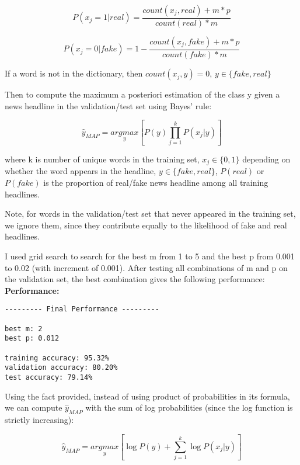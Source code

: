 \documentclass{article}
\begin{document}
$$P(x_j = 1 | real) = \frac{count(x_j, real) + m*p}{count(real) * m}$$

$$P(x_j = 0 | fake) = 1 - \frac{count(x_j, fake)+m*p}{count(fake) * m} $$

If a word is not in the dictionary, then $count(x_j, y) = 0$, $y\in \{fake, real\}$

Then to compute the maximum a posteriori estimation of the class y given a news headline in the validation/test set using Bayes' rule:

$$\hat{y}_{MAP} = \underset{y}{argmax} [P(y)\prod_{j = 1}^k P(x_j | y)]$$

where k is number of unique words in the training set, $x_j \in \{0, 1\}$ depending on whether the word appears in the headline, $y \in \{fake, real\}$, $P(real)$ or $P(fake)$ is the proportion of real/fake news headline among all training headlines.

Note, for words in the validation/test set that never appeared in the training set, we ignore them, since they contribute equally to the likelihood of fake and real headlines.

I used grid search to search for the best m from 1 to 5 and the best p from 0.001 to 0.02 (with increment of 0.001). After testing all combinations of m and p on the validation set, the best combination gives the following performance:\\

\noindent
\textbf{Performance:}
\begin{verbatim}
--------- Final Performance ---------

best m: 2
best p: 0.012

training accuracy: 95.32%
validation accuracy: 80.20%
test accuracy: 79.14%
\end{verbatim}

Using the fact provided, instead of using product of probabilities in its formula, we can compute $\hat{y}_{MAP}$ with the sum of log probabilities (since the log function is strictly increasing):

$$\hat{y}_{MAP} = \underset{y}{argmax} [\log P(y) + \sum_{j = 1}^k \log P(x_j | y)]$$
\end{document}
